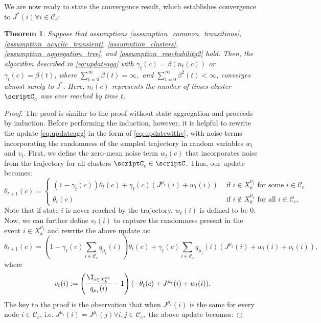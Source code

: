 \documentclass[12pt]{article}
\newtheorem{theorem}{Theorem}
\begin{document}
We are now ready to state the convergence result, which establishes convergence to $J^*(i) \forall i \in \mathcal{C}_c$:
\begin{theorem}
	Suppose that assumptions \ref{assumption_common_transitions}, \ref{assumption_acyclic_transient}, \ref{assumption_clusters}, \ref{assumption_aggregation_tree}, and \ref{assumption_reachability2} hold. Then, the algorithm described in \eqref{eq:updateagg} with $\gamma_t(c) = \beta(n_t(c))$ or $\gamma_t(c) = \beta(t)$, where $\sum_{t=0}^\infty \beta(t) = \infty,$ and $\sum_{t=0}^\infty \beta^2(t) < \infty$,  converges almost surely to $J^*$. Here, $n_t(c)$ represents the number of times \textit{cluster} $\scriptC_c$ was ever reached by time $t$.
\end{theorem}
\begin{proof}
The proof is similar to the proof without state aggregation and proceeds by induction. Before performing the induction, however, it is helpful to rewrite the update \eqref{eq:updateagg} in the form of \eqref{eq:updatewithv}, with noise terms incorporating the randomness of the sampled trajectory in random variables $w_t$ and $v_t$. First, we define the zero-mean noise term $w_t(c)$ that incorporates noise from the trajectory for all clusters $\scriptC_c \in \scriptC$. Thus, our update becomes:
\begin{equation*}
	\theta_{t+1}(c) = \begin{cases}(1 - \gamma_t(c))\theta_t(c) + \gamma_t(c)(J^{\mu_t}(i) + w_t(i)) & \text{ if $i \in X_k^{\mu_t} $ for some $i \in \mathcal{C}_c$}\\
	\theta_t(c) & \text{ if $i \notin X_k^{\mu_t}$ for all $i \in \mathcal{C}_c$},
	\end{cases}
\end{equation*}
Note that if state $i$ is never reached by the trajectory, $w_t(i)$ is defined to be 0. Now, we can further define $v_t(i)$ to capture the randomness present in the event $i \in X_k^{\mu_t}$ and rewrite the above update as:
\begin{equation*}
	\theta_{t+1}(c) = \left(1 - \gamma_t(c) \sum_{i \in \mathcal{C}_c} q_{\mu_t}(i)\right) \theta_t(c) + \gamma_t(c) \sum_{i \in \mathcal{C}_c} q_{\mu_t}(i) \left( J^{\mu_t}(i) + w_t(i) + v_t(i) \right),
\end{equation*}
where
\begin{equation*}
	v_t(i) := \left( \frac{\I_{i \in X_k^{\mu_t}}}{q_{\mu_t}(i)} - 1 \right)(-\theta_t(c) + J^{\mu_t}(i) + w_t(i)).
\end{equation*}
The key to the proof is the observation that when $J^{\mu_t}(i)$ is the same for every node $i \in \mathcal{C}_c$, i.e. $J^{\mu_t}(i)=J^{\mu_t}(j) \forall i, j \in \mathcal{C}_c,$ the above update becomes:

\end{proof}
\end{document}
